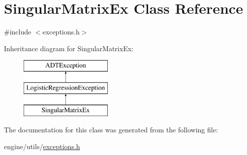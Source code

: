 \hypertarget{classSingularMatrixEx}{
\section{SingularMatrixEx Class Reference}
\label{classSingularMatrixEx}
}


{\ttfamily \#include $<$exceptions.h$>$}

Inheritance diagram for SingularMatrixEx:\begin{figure}[H]
\begin{center}
\leavevmode
\includegraphics[height=3cm]{classSingularMatrixEx}
\end{center}
\end{figure}


The documentation for this class was generated from the following file:\begin{DoxyCompactItemize}
\item 
engine/utils/\hyperlink{exceptions_8h}{exceptions.h}\end{DoxyCompactItemize}
